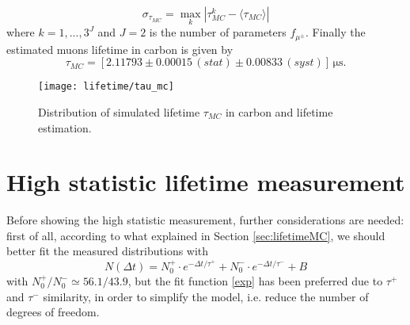 \begin{equation}
\sigma_{\tau_{MC}}=\max_k\left| \tau_{MC}^k -\langle \tau_{MC} \rangle\right|
\end{equation}
where $k=1, ..., 3^J$ and $J=2$ is the number of parameters $f_{\mu^{\pm}}$.
Finally the estimated muons lifetime in carbon is given by
\begin{equation}\label{tauMC}
\tau_{MC} = \left[ 2.11793  \pm 0.00015 \, (stat) \pm  0.00833 \, (syst) \right]\, \si{\micro\second}.
\end{equation}
\begin{figure}[!htp]
	\centering
	\texttt{[image: lifetime/tau\_mc]}
	\caption{Distribution of simulated lifetime $\tau_{MC}$ in carbon and lifetime estimation.}
	\label{fig::tau_mc}
\end{figure}

\section{High statistic lifetime measurement}
Before showing the high statistic measurement, further considerations are needed: first of all, according to what explained in Section \ref{sec:lifetimeMC}, we should better fit the measured distributions with
\begin{equation}\label{2exp}
	N(\Delta t) = N_0^+\cdot e^{-\Delta t/\tau^+} + N_0^-\cdot e^{-\Delta t/\tau^-} + B
\end{equation}
with $N_0^+/N_0^-\simeq 56.1/43.9$, but the fit function \eqref{exp} has been preferred due to $\tau^+$ and $\tau^-$ similarity, in order to simplify the model, i.e. reduce the number of degrees of freedom.

